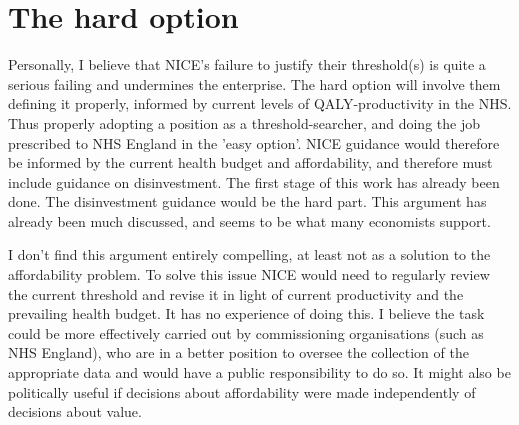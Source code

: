 \section{The hard option}
Personally, I believe that NICE's failure to justify their threshold(s) is quite a serious failing and undermines the enterprise. The hard option will involve them defining it properly, informed by current levels of QALY-productivity in the NHS. Thus properly adopting a position as a threshold-searcher\cite{Culyer_2007}, and doing the job prescribed to NHS England in the 'easy option'. NICE guidance would therefore be informed by the current health budget and affordability, and therefore must include guidance on disinvestment. The first stage of this work has already been done\cite{claxton2013methods}. The disinvestment guidance would be the hard part. This argument has already been much discussed, and seems to be what many economists support\cite{Claxton_2014,Raftery_2009,McCabe_2008}.

I don't find this argument entirely compelling, at least not as a solution to the affordability problem. To solve this issue NICE would need to regularly review the current threshold and revise it in light of current productivity and the prevailing health budget. It has no experience of doing this. I believe the task could be more effectively carried out by commissioning organisations (such as NHS England), who are in a better position to oversee the collection of the appropriate data and would have a public responsibility to do so. It might also be politically useful if decisions about affordability were made independently of decisions about value.